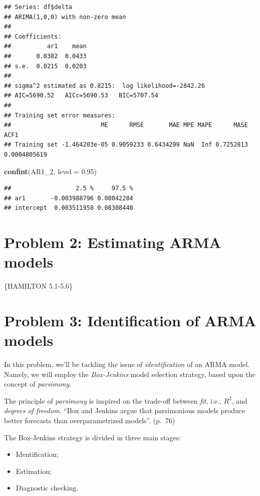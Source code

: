 \documentclass[11pt, a4paper]{report}
\newenvironment{Shaded}{\begin{snugshade}}{\end{snugshade}}
\newcommand{\DataTypeTok}[1]{\textcolor[rgb]{0.13,0.29,0.53}{#1}}
\newcommand{\DecValTok}[1]{\textcolor[rgb]{0.00,0.00,0.81}{#1}}
\newcommand{\FloatTok}[1]{\textcolor[rgb]{0.00,0.00,0.81}{#1}}
\newcommand{\KeywordTok}[1]{\textcolor[rgb]{0.13,0.29,0.53}{\textbf{#1}}}
\newcommand{\NormalTok}[1]{#1}
\theoremstyle{plain}
\theoremstyle{plain}
\theoremstyle{remark}
\begin{document}
\begin{verbatim}
## Series: df$delta 
## ARIMA(1,0,0) with non-zero mean 
## 
## Coefficients:
##          ar1    mean
##       0.0382  0.0433
## s.e.  0.0215  0.0203
## 
## sigma^2 estimated as 0.8215:  log likelihood=-2842.26
## AIC=5690.52   AICc=5690.53   BIC=5707.54
## 
## Training set error measures:
##                         ME      RMSE       MAE MPE MAPE      MASE         ACF1
## Training set -1.464203e-05 0.9059233 0.6434299 NaN  Inf 0.7252813 0.0004805619
\end{verbatim}

\begin{Shaded}
\begin{Highlighting}[]
\KeywordTok{confint}\NormalTok{(AR1_}\DecValTok{2}\NormalTok{, }\DataTypeTok{level =} \FloatTok{0.95}\NormalTok{)}
\end{Highlighting}
\end{Shaded}

\begin{verbatim}
##                  2.5 %     97.5 %
## ar1       -0.003988796 0.08042284
## intercept  0.003511958 0.08308440
\end{verbatim}


\chapter{Problem 2: Estimating ARMA models} \label{Problem-2}

\{HAMILTON 5.1-5.6\}


\chapter{Problem 3: Identification of ARMA models}

In this problem, we'll be tackling the issue of \emph{identification} of
an ARMA model. Namely, we will employ the \emph{Box-Jenkins} model
selection strategy, based upon the concept of \emph{parsimony}.

The principle of \emph{parsimony} is inspired on the trade-off between
\emph{fit}, i.e., \(R^2\), and \emph{degrees of freedom}. ``Box and
Jenkins argue that parsimonious models produce better forecasts than
overparametrized models''. (p.~76)

The Box-Jenkins strategy is divided in three main stages:

\begin{itemize}
	\item Identification;
	\item Estimation;
	\item Diagnostic checking.
\end{itemize}
\end{document}

